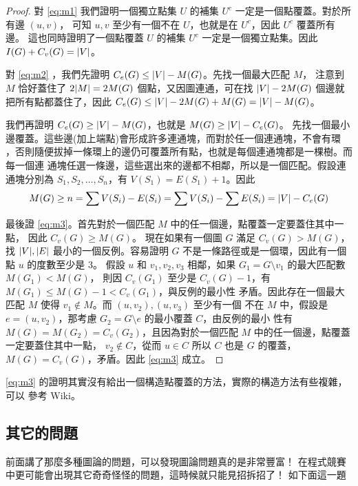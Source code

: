 \documentclass[a4paper,12pt]{book}
\begin{document}
\begin{proof}
  對 \eqref{eq:m1} 我們證明一個獨立點集 $U$ 的補集 $U^c$ 一定是一個點覆蓋。對於所有邊 $(u, v)$，
  可知 $u, v$ 至少有一個不在 $U$，也就是在 $U^c$，因此 $U^c$ 覆蓋所有邊。
  這也同時證明了一個點覆蓋 $U$ 的補集 $U^c$ 一定是一個獨立點集。因此 $I(G) + C_v(G) = \lvert V \rvert$。

  對 \eqref{eq:m2} ，我們先證明 $C_e(G) \leq \lvert V \rvert - M(G)$。先找一個最大匹配 $M$，
  注意到 $M$ 恰好蓋住了 $2\lvert M \rvert = 2 M(G)$ 個點，又因圖連通，可在找 $\lvert V \rvert - 2 M(G)$
  個邊就把所有點都蓋住了，因此 $C_e(G) \leq \lvert V \rvert - 2 M(G) + M(G) = \lvert V \rvert - M(G)$。

  我們再證明 $C_e(G) \geq \lvert V \rvert - M(G)$，也就是 $M(G) \geq \lvert V \rvert - C_e(G)$。
  先找一個最小邊覆蓋。這些邊(加上端點)會形成許多連通塊，而對於任一個連通塊，不會有環
  ，否則隨便拔掉一條環上的邊仍可覆蓋所有點，也就是每個連通塊都是一棵樹。而每一個連
  通塊任選一條邊，這些選出來的邊都不相鄰，所以是一個匹配。假設連通塊分別為
  $S_1, S_2, \dots, S_n$，有 $V(S_1) = E(S_1) + 1$。因此
  \[ M(G) \geq n = \sum V(S_i) - E(S_i) = \sum V(S_i) - \sum E(S_i) = \lvert V \rvert - C_e(G) \]
  
  最後證 \eqref{eq:m3}。首先對於一個匹配 $M$ 中的任一個邊，點覆蓋一定要蓋住其中一點，
  因此 $C_v(G) \geq M(G)$。 現在如果有一個圖 $G$ 滿足 $C_v(G) > M(G)$，找 $\lvert V \rvert, \lvert E \rvert$
  最小的一個反例。容易證明 $G$ 不是一條路徑或是一個環，因此有一個點 $u$ 的度數至少是 $3$。
  假設 $u$ 和 $v_1, v_2, v_3$ 相鄰，如果 $G_1 = G \setminus v_1$ 的最大匹配數 $M(G_1) < M(G)$，
  則因 $C_v(G_1)$ 至少是 $C_v(G) - 1$，有 $M(G_1) \leq M(G) - 1 < C_v(G_1)$，與反例的最小性
  矛盾。因此存在一個最大匹配 $M$ 使得 $v_1 \notin M$。而 $(u, v_2), (u, v_3)$ 至少有一個
  不在 $M$ 中，假設是 $e = (u, v_2)$，那考慮 $G_2 = G \setminus e$ 的最小覆蓋 $C$，由反例的最小
  性有 $M(G) = M(G_2) = C_v(G_2)$，且因為對於一個匹配 $M$ 中的任一個邊，點覆蓋一定要蓋住其中一點，
  $v_2 \notin C$，從而 $u \in C$ 所以 $C$ 也是 $G$ 的覆蓋，$M(G) = C_v(G)$，矛盾。因此
  \eqref{eq:m3} 成立。
\end{proof}

\eqref{eq:m3} 的證明其實沒有給出一個構造點覆蓋的方法，實際的構造方法有些複雜，可以
參考 Wiki。

\subsection{其它的問題}
前面講了那麼多種圖論的問題，可以發現圖論問題真的是非常豐富！
在程式競賽中更可能會出現其它奇奇怪怪的問題，這時候就只能見招拆招了！
如下面這一題
\end{document}

